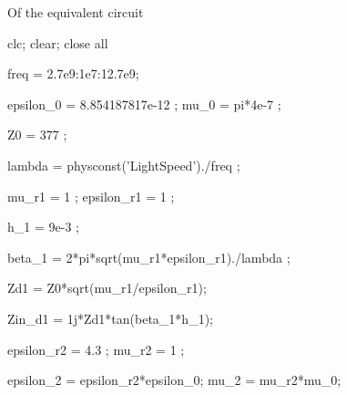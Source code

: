 
\begin{par}
\begin{flushleft}
Of the equivalent circuit
\end{flushleft}
\end{par}

\begin{matlabcode}
clc; clear; close all

freq = 2.7e9:1e7:12.7e9;

epsilon_0 = 8.854187817e-12 ;%
mu_0 = pi*4e-7 ;%

Z0 = 377 ;%
\end{matlabcode}



\begin{matlabcode}
lambda = physconst('LightSpeed')./freq ;%

mu_r1 = 1 ;%
epsilon_r1 = 1 ;%

h_1 = 9e-3 ;%
\end{matlabcode}



\begin{matlabcode}
beta_1 = 2*pi*sqrt(mu_r1*epsilon_r1)./lambda ;%
\end{matlabcode}



\begin{matlabcode}
Zd1 = Z0*sqrt(mu_r1/epsilon_r1);

Zin_d1 = 1j*Zd1*tan(beta_1*h_1);
\end{matlabcode}



\begin{matlabcode}
epsilon_r2 = 4.3 ;%
mu_r2 = 1 ;%

epsilon_2 = epsilon_r2*epsilon_0;
mu_2 = mu_r2*mu_0;
\end{matlabcode}



